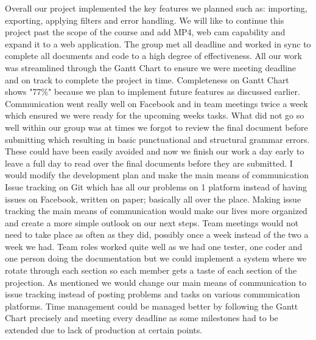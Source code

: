\documentclass{article}
\begin{document}
\indent Overall our project implemented the key features we planned such as: importing, exporting, applying filters and error handling. We will like to continue this project past the scope of the course and add MP4, web cam capability and expand it to a web application. The group met all deadline and worked in sync to complete all documents and code to a high degree of effectiveness. All our work was streamlined through the Gantt Chart to ensure we were meeting deadline and on track to complete the project in time. Completeness on Gantt Chart shows "77\%"  because we plan to implement future features as discussed earlier. Communication went really well on Facebook and in team meetings twice a week which ensured we were ready for the upcoming weeks tasks. What did not go so well within our group was at times we forgot to review the final document before submitting which resulting in basic punctuational and structural grammar errors. These could have been easily avoided and now we finish our work a day early to leave a full day to read over the final documents before they are submitted. I would modify the development plan and make the main means of communication Issue tracking on Git which has all our problems on 1 platform instead of having issues on Facebook, written on paper; basically all over the place. Making issue tracking the main means of communication would make our lives more organized and create a more simple outlook on our next steps. Team meetings would not need to take place as often as they did, possibly once a week instead of the two a week we had. Team roles worked quite well as we had one tester, one coder and one person doing the documentation but we could implement a system where we rotate through each section so each member gets a taste of each section of the projection. As mentioned we would change our main means of communication to issue tracking instead of posting problems and tasks on various communication platforms. Time management could be managed better by following the Gantt Chart precisely and meeting every deadline as some milestones had to be extended due to lack of production at certain points.
\end{document}
